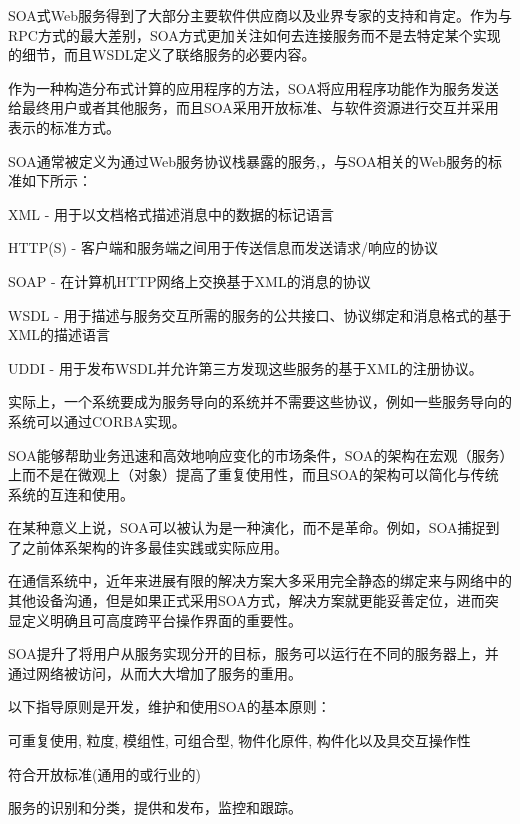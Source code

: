 SOA式Web服务得到了大部分主要软件供应商以及业界专家的支持和肯定。作为与RPC方式的最大差别，SOA方式更加关注如何去连接服务而不是去特定某个实现的细节，而且WSDL定义了联络服务的必要内容。

作为一种构造分布式计算的应用程序的方法，SOA将应用程序功能作为服务发送给最终用户或者其他服务，而且SOA采用开放标准、与软件资源进行交互并采用表示的标准方式。

SOA通常被定义为通过Web服务协议栈暴露的服务,，与SOA相关的Web服务的标准如下所示：

\begin{compactitem}
\item XML - 用于以文档格式描述消息中的数据的标记语言
\item HTTP(S) - 客户端和服务端之间用于传送信息而发送请求/响应的协议
\item SOAP - 在计算机HTTP网络上交换基于XML的消息的协议
\item WSDL - 用于描述与服务交互所需的服务的公共接口、协议绑定和消息格式的基于XML的描述语言
\item UDDI - 用于发布WSDL并允许第三方发现这些服务的基于XML的注册协议。
\end{compactitem}

实际上，一个系统要成为服务导向的系统并不需要这些协议，例如一些服务导向的系统可以通过CORBA实现。

SOA能够帮助业务迅速和高效地响应变化的市场条件，SOA的架构在宏观（服务）上而不是在微观上（对象）提高了重复使用性，而且SOA的架构可以简化与传统系统的互连和使用。

在某种意义上说，SOA可以被认为是一种演化，而不是革命。例如，SOA捕捉到了之前体系架构的许多最佳实践或实际应用。

在通信系统中，近年来进展有限的解决方案大多采用完全静态的绑定来与网络中的其他设备沟通，但是如果正式采用SOA方式，解决方案就更能妥善定位，进而突显定义明确且可高度跨平台操作界面的重要性。

SOA提升了将用户从服务实现分开的目标，服务可以运行在不同的服务器上，并通过网络被访问，从而大大增加了服务的重用。

以下指导原则是开发，维护和使用SOA的基本原则：

\begin{compactitem}
\item 可重复使用, 粒度, 模组性, 可组合型, 物件化原件, 构件化以及具交互操作性
\item 符合开放标准(通用的或行业的)
\item 服务的识别和分类，提供和发布，监控和跟踪。
\end{compactitem}

